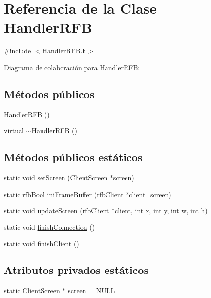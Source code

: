 \hypertarget{classHandlerRFB}{\section{Referencia de la Clase Handler\-R\-F\-B}
\label{classHandlerRFB}
}


{\ttfamily \#include $<$Handler\-R\-F\-B.\-h$>$}



Diagrama de colaboración para Handler\-R\-F\-B\-:
\subsection*{Métodos públicos}
\begin{DoxyCompactItemize}
\item 
\hyperlink{classHandlerRFB_a380840a9c41b9d81b4391c4a6c02f552}{Handler\-R\-F\-B} ()
\item 
virtual \hyperlink{classHandlerRFB_a67c40c4e0a209c77693df07295e9c82b}{$\sim$\-Handler\-R\-F\-B} ()
\end{DoxyCompactItemize}
\subsection*{Métodos públicos estáticos}
\begin{DoxyCompactItemize}
\item 
static void \hyperlink{classHandlerRFB_a6208a6166deccda656b80b7b7d954abb}{set\-Screen} (\hyperlink{classClientScreen}{Client\-Screen} $\ast$\hyperlink{classHandlerRFB_a0b22cc3fbf6603e02d33c51b4ed11432}{screen})
\item 
static rfb\-Bool \hyperlink{classHandlerRFB_a574d5d29dce6b5700d59480a8b247d77}{ini\-Frame\-Buffer} (rfb\-Client $\ast$client\-\_\-screen)
\item 
static void \hyperlink{classHandlerRFB_a1507701a4adb4952e0946993bd491093}{update\-Screen} (rfb\-Client $\ast$client, int x, int y, int w, int h)
\item 
static void \hyperlink{classHandlerRFB_acf7030c8441d5aacac10e014460ec59e}{finish\-Connection} ()
\item 
static void \hyperlink{classHandlerRFB_ab00b49e201ac9eade5824b8d9b27709e}{finish\-Client} ()
\end{DoxyCompactItemize}
\subsection*{Atributos privados estáticos}
\begin{DoxyCompactItemize}
\item 
static \hyperlink{classClientScreen}{Client\-Screen} $\ast$ \hyperlink{classHandlerRFB_a0b22cc3fbf6603e02d33c51b4ed11432}{screen} = N\-U\-L\-L
\end{DoxyCompactItemize}


